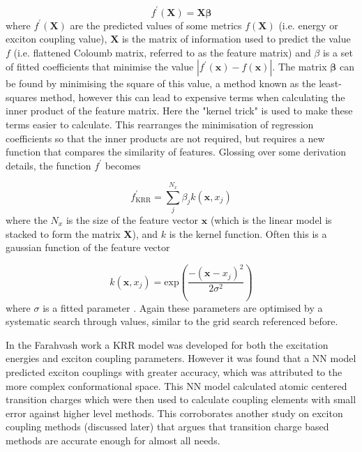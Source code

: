 \begin{equation}
	f^\prime\left(\mathbf{X}\right) = \mathbf{X} \mathbf{\beta}
\end{equation}
%
where $f^\prime\left(\mathbf{X}\right)$ are the predicted values of some metrics $f\left(\mathbf{X}\right)$ 
(i.e. \Qy energy or exciton coupling value), $\mathbf{X}$ is the matrix of information
used to predict the value $f$ (i.e. flattened Coloumb matrix, referred to as the feature
matrix) and $\beta$ is a set of fitted coefficients that minimise the value $\left\lvert f^\prime \left( \mathbf{x}\right) - f \left(\mathbf{x}\right)\right\rvert$.
The matrix $\mathbf{\beta}$ can be found by minimising the square of this value, 
a method known as the least-squares method, however this can lead to expensive terms 
when calculating the inner product of the feature matrix. Here the "kernel trick" 
is used to make these terms easier to calculate. This rearranges the minimisation 
of regression coefficients so that the inner products are not required, but requires 
a new function that compares the similarity of features. Glossing over some derivation
details, the function $f^\prime$ becomes

\begin{equation}
	f_{\text{KRR}}^\prime = \sum^{N_x}_j \beta_j k\left(\mathbf{x}, x_j\right)
\end{equation}
%
where the $N_x$ is the size of the feature vector $\mathbf{x}$ (which is the linear
model is stacked to form the matrix $\mathbf{X}$), and $k$ is the kernel function.
Often this is a gaussian function of the feature vector

\begin{equation}
	k\left(\mathbf{x}, x_j\right) = \text{exp}\left(\frac{-\left(\mathbf{x}-x_j\right)^2}{2\sigma^2}\right)
\end{equation}
%
where $\sigma$ is a fitted parameter \cite{Rasmussen2006}. Again these parameters 
are optimised by a systematic search through values, similar to the grid search
referenced before.

In the Farahvash work a KRR model was developed for both the excitation energies
and exciton coupling parameters. However it was found that a NN model predicted 
exciton couplings with greater accuracy, which was attributed to the more complex 
conformational space. This NN model calculated atomic centered transition charges 
which were then used to calculate coupling elements with small error against higher 
level methods. This corroborates another study on exciton coupling methods (discussed
later) that argues that transition charge based methods are accurate enough for 
almost all needs.

